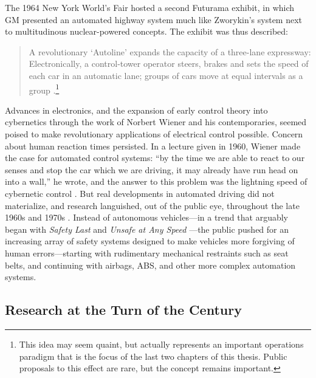 

The 1964 New York World's Fair hosted a second Futurama exhibit, in
which GM presented an automated highway system much like Zworykin's
system next to multitudinous nuclear-powered concepts. The exhibit was
thus described: 
\begin{quote}A revolutionary `Autoline' expands the capacity of a three-lane
expressway: Electronically, a control-tower operator steers, brakes
and sets the speed of each car in an automatic lane; groups of cars
move at equal intervals as a group \cite[p. 9]{wetmore}.\footnote{This
idea may seem quaint, but actually represents an important operations
paradigm that is the focus of the last two chapters of this thesis.
Public proposals to this effect are rare, but the concept remains
important.}\end{quote}
 Advances in
electronics, and the expansion of early control theory into
cybernetics through the work of Norbert Wiener and his contemporaries, seemed
poised to make revolutionary applications of electrical control
possible. Concern about human reaction times persisted. In a lecture given in 1960, Wiener
made the case for automated control systems: ``by the time we are able
to react to our senses and stop the car which we are driving, it may
already have run head on into a wall,'' he wrote, and the answer to
this problem was the lightning speed of cybernetic control \cite{wienerOn}. But real
developments in automated driving did not materialize, and research
languished, out of the public eye, throughout the late 1960s and 1970s
\cite[p. 10]{wetmore}. Instead of autonomous vehicles---in a trend
that arguably began
with \emph{Safety Last} \cite{oconnellmyers} and \emph{Unsafe at Any Speed} \cite{nader}---the public pushed
for an
increasing array of safety systems designed to make vehicles more forgiving
of human errors---starting with rudimentary
mechanical restraints such as seat belts, and continuing with
airbags, ABS, and other more complex automation systems.

\subsection{Research at the Turn of the Century}

